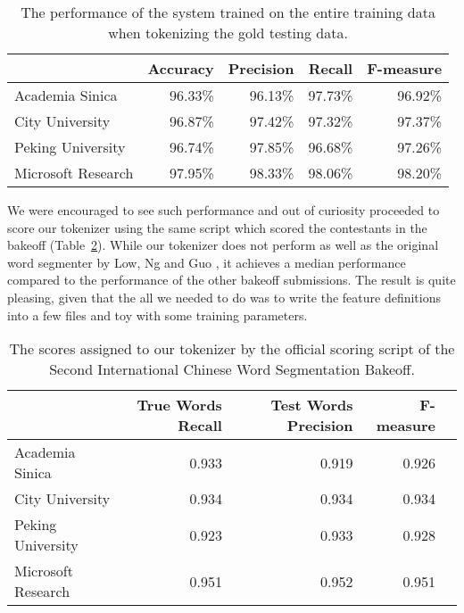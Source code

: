 \begin{table}
  \begin{center}
    \begin{tabular}{ | l | r | r | r | r | }
      \hline
      & Accuracy & Precision & Recall & F-measure \\ \hline
      Academia Sinica & 96.33\% & 96.13\% & 97.73\% & 96.92\% \\ \hline
      City University & 96.87\% & 97.42\% & 97.32\% & 97.37\% \\ \hline
      Peking University & 96.74\% & 97.85\% & 96.68\% & 97.26\% \\ \hline
      Microsoft Research & 97.95\% & 98.33\% & 98.06\% & 98.20\% \\
      \hline
    \end{tabular}
  \end{center}
  \caption[Final performance of Chinese segmenter]
    {The performance of the system trained on the entire training data when
     tokenizing the gold testing data.}
  \label{tbl:bakeoff-final}
\end{table}


We were encouraged to see such performance and out of curiosity proceeded to
score our tokenizer using the same script which scored the contestants in the
bakeoff (Table~\ref{tbl:bakeoff-score}). While our tokenizer does not perform
as well as the original word segmenter by Low, Ng and Guo
\cite{seg-chinese-maxent}, it achieves a median performance compared to the
performance of the other bakeoff submissions. The result is quite pleasing,
given that the all we needed to do was to write the feature definitions into a
few files and toy with some training parameters.

\begin{table}
  \begin{center}
    \begin{tabular}{ | l | r | r | r | r | }
      \hline
      & True Words Recall & Test Words Precision & F-measure \\ \hline
      Academia Sinica & 0.933 & 0.919 & 0.926 \\ \hline
      City University & 0.934 & 0.934 & 0.934 \\ \hline
      Peking University & 0.923 & 0.933 & 0.928 \\ \hline
      Microsoft Research & 0.951 & 0.952 & 0.951 \\
      \hline
    \end{tabular}
  \end{center}
  \caption[Chinese Word Segmentation scores]
    {The scores assigned to our tokenizer by the official scoring script of the
    Second International Chinese Word Segmentation Bakeoff.}
  \label{tbl:bakeoff-score}
\end{table}


